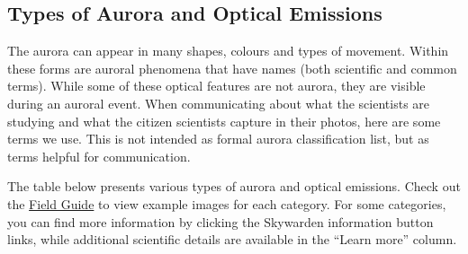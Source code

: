 \documentclass{article}
\newcommand{\contributed}[1]{%
    \par\noindent
    \begingroup
    \setlength{\leftskip}{1em}%
    \itshape
    Contributors: #1
    \par
    \endgroup
    \vspace{0.5em}
}
\begin{document}
\subsection{Types of Aurora and Optical Emissions}
\label{types-of-aurora-and-optical-emissions}

The aurora can appear in many shapes, colours and types of movement.  Within these forms are auroral phenomena that have names (both scientific and common terms). While some of these optical features are not aurora, they are visible during an auroral event. When communicating about what the scientists are studying and what the citizen scientists capture in their photos, here are some terms we use. This is not intended as formal aurora classification list, but as terms helpful for communication.

The table below presents various types of aurora and optical emissions. Check out the \href{https://kherli.github.io/Aurora-Field-Guide-And-Handbook/_static/Aurora_Field_Guide.pdf}{Field Guide} to view example images for each category. For some categories, you can find more information by clicking the Skywarden information button links, while additional scientific details are available in the ``Learn more'' column.
\end{document}
